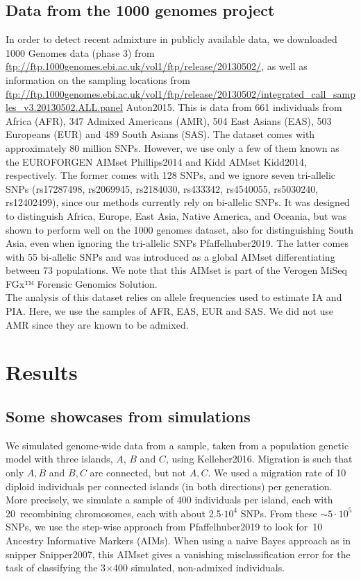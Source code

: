 \documentclass[12pt]{article}
\theoremstyle{definition}
\begin{document}
\subsection{Data from the 1000 genomes project}
In order to detect recent admixture in publicly available data, we
downloaded 1000 Genomes data (phase 3) from
\url{ftp://ftp.1000genomes.ebi.ac.uk/vol1/ftp/release/20130502/}, as
well as information on the sampling locations from
\url{ftp://ftp.1000genomes.ebi.ac.uk/vol1/ftp/release/20130502/integrated_call_samples_v3.20130502.ALL.panel}
\cite{article}{Auton2015}. This is data from 661 individuals from
Africa (AFR), 347 Admixed Americans (AMR), 504 East Asians (EAS), 503
Europeans (EUR) and 489 South Asians (SAS). The dataset comes with
approximately 80 million SNPs. However, we use only a few of them
known as the EUROFORGEN AIMset \cite{article}{Phillips2014} and Kidd
AIMset \cite{article}{Kidd2014}, respectively. The former comes with
128 SNPs, and we ignore seven tri-allelic SNPs (rs17287498, rs2069945,
rs2184030, rs433342, rs4540055, rs5030240, rs12402499), since our
methods currently rely on bi-allelic SNPs. It was designed to
distinguish Africa, Europe, East Asia, Native America, and Oceania,
but was shown to perform well on the 1000 genomes dataset, also for
distinguishing South Asia, even when ignoring the tri-allelic SNPs
\cite{article}{Pfaffelhuber2019}.  The latter comes with 55 bi-allelic
SNPs and was introduced as a global AIMset differentiating between 73
populations. We note that this AIMset is part of the Verogen MiSeq
FGx™ Forensic Genomics Solution.
\\
The analysis of this dataset relies on allele frequencies used to
estimate IA and PIA. Here, we use the samples of AFR, EAS, EUR and
SAS. We did not use AMR since they are known to be admixed.

\section{Results}

\subsection{Some showcases from simulations}
We simulated genome-wide data from a sample, taken from a population
genetic model with three islands, $A$, $B$ and $C$, using
\cite{article}{Kelleher2016}. Migration is such that only $A, B$ and $B, C$ are
connected, but not $A, C$. We used a migration rate of 10 diploid
individuals per connected islands (in both directions) per
generation. More precisely, we simulate a sample of 400 individuals
per island, each with 20~recombining chromosomes, each with about
2.5$\cdot 10^4$ SNPs. From these $\sim 5\cdot 10^5$ SNPs, we use the
step-wise approach from \cite{article}{Pfaffelhuber2019} to look for~10
Ancestry Informative Markers (AIMs). When using a naive Bayes approach
as in {\sc snipper} \cite{article}{Snipper2007}, this AIMset gives a vanishing
misclassification error for the task of classifying the 3$\times$400
simulated, non-admixed individuals.
\end{document}
